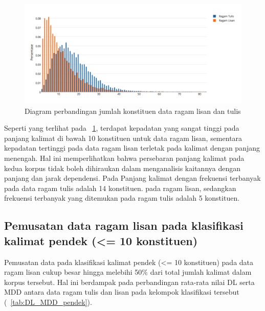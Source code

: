 \begin{figure}
	\centering \includegraphics[width=1
	\textwidth] {pics/Jumlah_kata.png} 
	\caption{Diagram perbandingan jumlah konstituen data ragam lisan dan tulis} 
	\label{fig:jumlah_kata} 
\end{figure}

Seperti yang terlihat pada \pic~\ref{fig:jumlah_kata}, terdapat kepadatan yang sangat tinggi pada panjang kalimat di bawah 10 konstituen untuk data ragam lisan, sementara kepadatan tertinggi pada data ragam lisan terletak pada kalimat dengan panjang menengah. Hal ini memperlihatkan bahwa persebaran panjang kalimat pada kedua korpus tidak boleh dihiraukan dalam menganalisis kaitannya dengan panjang dan jarak dependensi. Pada Panjang kalimat dengan frekuensi terbanyak pada data ragam tulis adalah 14 konstituen.  pada ragam lisan, sedangkan frekuensi terbanyak yang ditemukan pada ragam tulis adalah 5 konstituen.

\subsection{Pemusatan data ragam lisan pada klasifikasi kalimat pendek (\textless= 10 konstituen)}
Pemusatan data pada klasifikasi kalimat pendek (\textless= 10 konstituen) pada data ragam lisan cukup besar hingga melebihi 50\% dari total jumlah kalimat dalam korpus tersebut. Hal ini berdampak pada perbandingan rata-rata nilai DL serta MDD antara data ragam tulis dan lisan pada kelompok klasifikasi tersebut (\tab~\ref{tab:DL_MDD_pendek}).

